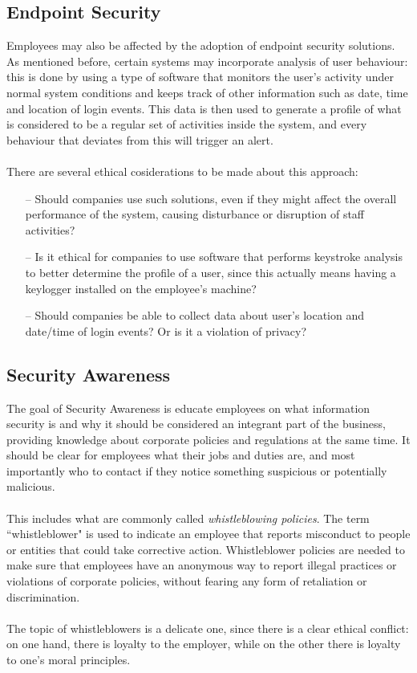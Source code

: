 	\subsection{Endpoint Security}
	Employees may also be affected by the adoption of endpoint security solutions. As mentioned before, certain systems may incorporate analysis of user behaviour: this is done by using a type of software that monitors the user's activity under normal system conditions and keeps track of other information such as date, time and location of login events. This data is then used to generate a profile of what is considered to be a regular set of activities inside the system, and every behaviour that deviates from this will trigger an alert.\\\\
	There are several ethical cosiderations to be made about this approach:
	\begin{itemize}
		\item[--] Should companies use such solutions, even if they might affect the overall performance of the system, causing disturbance or disruption of staff activities?
		\item[--] Is it ethical for companies to use software that performs keystroke analysis to better determine the profile of a user, since this actually means having a keylogger installed on the employee's machine?
		\item[--] Should companies be able to collect data about user's location and date/time of login events? Or is it a violation of privacy?
	\end{itemize}
	

	\subsection{Security Awareness} 
	The goal of Security Awareness is educate employees on what information security is and why it should be considered an integrant part of the business, providing knowledge about corporate policies and regulations at the same time. It should be clear for employees what their jobs and duties are, and most importantly who to contact if they notice something suspicious or potentially malicious.\\\\
	This includes what are commonly called \textit{whistleblowing policies}. The term ``whistleblower" is used to indicate an employee that reports misconduct to people or entities that could take corrective action. Whistleblower policies are needed to make sure that employees have an anonymous way to report illegal practices or violations of corporate policies, without fearing any form of retaliation or discrimination.\\\\
	The topic of whistleblowers is a delicate one, since there is a clear ethical conflict: on one hand, there is loyalty to the employer, while on the other there is loyalty to one's moral principles.
